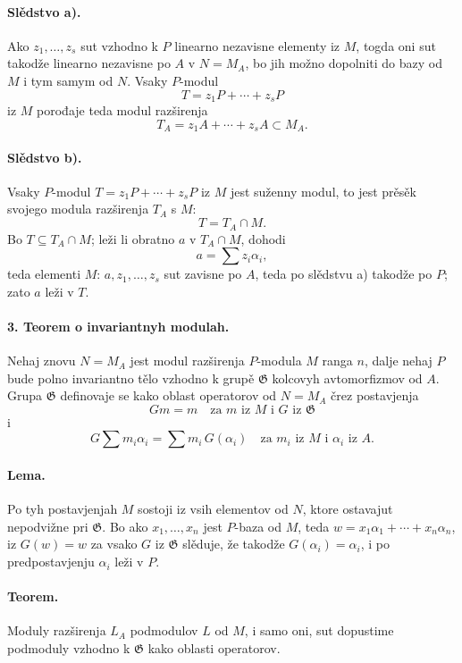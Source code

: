 \documentclass[11pt]{article}
\providecommand{\frG}{\mathfrak G}
\begin{document}
\paragraph{Slědstvo a).}
Ako \(z_1,\ldots,z_s\) sut vzhodno k \(P\) linearno nezavisne elementy iz \(M\), togda oni sut takodže linearno nezavisne po \(A\) v \(N=M_A\), bo jih možno dopolniti do bazy od \(M\) i tym samym od \(N\). Vsaky \(P\)-modul
\[
        T=z_1P+\cdots+z_sP
\]
iz \(M\) porođaje teda modul razširenja
\[
        T_A=z_1A+\cdots+z_sA\subset M_A.
\]

\paragraph{Slědstvo b).}
Vsaky \(P\)-modul \(T=z_1P+\cdots+z_sP\) iz \(M\) jest suženny modul, to jest prěsěk svojego modula razširenja \(T_A\) s \(M\):
\[
        T=T_A\cap M .
\]
Bo \(T\subseteq T_A\cap M\); leži li obratno \(a\) v \(T_A\cap M\), dohodi
\[
        a=\sum z_i\alpha_i,
\]
teda elementi \(M\): \(a,z_1,\ldots,z_s\) sut zavisne po \(A\), teda po slědstvu a) takodže po \(P\); zato \(a\) leži v \(T\).

\paragraph{3. Teorem o invariantnyh modulah.}
Nehaj znovu \(N=M_A\) jest modul razširenja \(P\)-modula \(M\) ranga \(n\), dalje nehaj \(P\) bude polno invariantno tělo vzhodno k grupě \(\frG\) kolcovyh avtomorfizmov od \(A\). Grupa \(\frG\) definovaje se kako oblast operatorov od \(N=M_A\) črez postavjenja
\[
        Gm=m\quad\text{za }m\text{ iz }M\text{ i }G\text{ iz }\frG
\]
i
\[
        G\sum m_i\alpha_i=\sum m_i\,G(\alpha_i)
        \quad\text{za }m_i\text{ iz }M\text{ i }\alpha_i\text{ iz }A.
\]

\paragraph{Lema.}
Po tyh postavjenjah \(M\) sostoji iz vsih elementov od \(N\), ktore ostavajut nepodvižne pri \(\frG\). Bo ako \(x_1,\ldots,x_n\) jest \(P\)-baza od \(M\), teda \(w=x_1\alpha_1+\cdots+x_n\alpha_n\), iz \(G(w)=w\) za vsako \(G\) iz \(\frG\) slěduje, že takodže \(G(\alpha_i)=\alpha_i\), i po predpostavjenju \(\alpha_i\) leži v \(P\).

\paragraph{Teorem.}
Moduly razširenja \(L_A\) podmodulov \(L\) od \(M\), i samo oni, sut dopustime podmoduly vzhodno k \(\frG\) kako oblasti operatorov.
\end{document}
